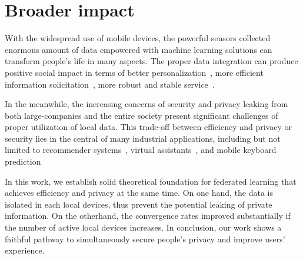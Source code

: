 
\section{Broader impact}
With the widespread use of mobile devices, the powerful sensors
collected enormous amount of data empowered with machine learning
solutions can transform people's life in many aspects. The proper
data integration can produce positive social
impact in terms of better personalization~\cite{fallah2020personalized}, more efficient information solicitation~\cite{chen2018federated}, more robust and stable service~\cite{47586}.

In the meanwhile, the increasing concerns of security and
privacy leaking from both large-companies and the entire society
present significant challenges of proper utilization of local
data. This trade-off between efficiency and privacy or security
lies in the central of many industrial applications, including 
but not limited to recommender systems~\cite{chen2018federated}, virtual assistants~\cite{lamautonomy}, and mobile keyboard prediction~\cite{47586}

In this work, we establish solid theoretical foundation for federated
learning that achieves efficiency and privacy at the same time. 
On one hand, the data is isolated in each local devices, thus prevent
the potential leaking of private information. On the otherhand, the
convergence rates improved substantially if the number of
active local devices increases. In conclusion, our work 
shows a faithful pathway to simultaneously secure people's privacy and improve
users' experience.



